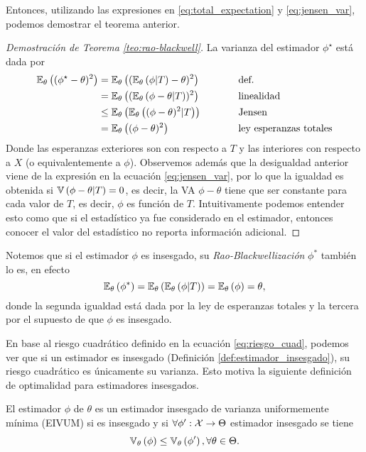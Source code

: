 Entonces, utilizando las expresiones en \eqref{eq:total_expectation} y \eqref{eq:jensen_var}, podemos demostrar el teorema anterior.

 \begin{proof}[Demostración de Teorema \ref{teo:rao-blackwell}]
 	La varianza del estimador $\phi^\star$ está dada por 
 	\begin{alignat*}{2}
 		\mathbb{E}_\theta \left((\phi^\star-\theta)^2\right) &= \mathbb{E}_\theta \left((\mathbb{E}_\theta \left(\phi|T\right)-\theta)^2\right) \quad\quad\quad &&\text{def.}\\
 								&= \mathbb{E}_\theta \left((\mathbb{E}_\theta \left(\phi-\theta|T\right))^2\right)&& \text{linealidad}\\
 								&\leq \mathbb{E}_\theta \left(\mathbb{E}_\theta \left((\phi-\theta)^2|T\right)\right)&& \text{Jensen}\\
 								&= \mathbb{E}_\theta \left((\phi-\theta)^2\right) &&\text{ley esperanzas totales}
 	\end{alignat*}
Donde las esperanzas exteriores son con respecto a $T$ y las interiores con respecto a $X$ (o equivalentemente a $\phi$).  Observemos además que la desigualdad anterior viene de la expresión en la ecuación \eqref{eq:jensen_var}, por lo que la igualdad es obtenida si $\mathbb{V} \left(\phi-\theta|T\right) = 0$, es decir, la VA $\phi-\theta$ tiene que ser constante para cada valor de $T$, es decir, $\phi$ es función de $T$. Intuitivamente podemos entender esto como que si el estadístico ya fue considerado en el estimador, entonces conocer el valor del estadístico no reporta información adicional. 
 \end{proof}

\begin{remark}
	Notemos que si el estimador $\phi$ es insesgado, su \textit{Rao-Blackwellización} $\phi^*$ también lo es, en efecto
	\begin{equation}
		\mathbb{E}_\theta \left(\phi^*\right) = \mathbb{E}_\theta \left(\mathbb{E}_\theta \left(\phi|T\right)\right) = \mathbb{E}_\theta \left(\phi\right) = \theta,
	\end{equation}
	donde la segunda igualdad está dada por la ley de esperanzas totales y la tercera por el supuesto de que $\phi$ es insesgado.
\end{remark}



En base al riesgo cuadrático definido en la ecuación \eqref{eq:riesgo_cuad}, podemos ver que si un estimador es insesgado (Definición \ref{def:estimador_insesgado}), su riesgo cuadrático es únicamente su varianza. Esto motiva la siguiente definición de optimalidad para estimadores insesgados. 

 \begin{definition}
  	El estimador $\phi$ de $\theta$ es un estimador insesgado de varianza uniformemente mínima (EIVUM) si es insesgado y si $\forall \phi':{\mathcal X}\rightarrow \Theta$ estimador insesgado se tiene
  	\begin{equation}
  		\mathbb{V}_\theta \left(\phi\right)\leq\mathbb{V}_\theta \left(\phi'\right), \forall \theta\in\Theta.
  	\end{equation}
  \end{definition} 

